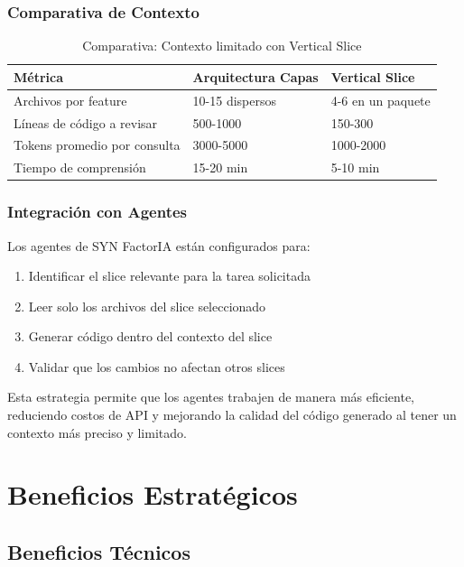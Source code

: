 \documentclass[12pt,a4paper,spanish]{article}
\begin{document}
\subsubsection{Comparativa de Contexto}

\begin{table}[h]
\centering
\begin{tabular}{@{}p{4cm}p{4cm}p{4cm}@{}}
\toprule
\textbf{Métrica} & \textbf{Arquitectura Capas} & \textbf{Vertical Slice} \\
\midrule
Archivos por feature & 10-15 dispersos & 4-6 en un paquete \\
\midrule
Líneas de código a revisar & 500-1000 & 150-300 \\
\midrule
Tokens promedio por consulta & 3000-5000 & 1000-2000 \\
\midrule
Tiempo de comprensión & 15-20 min & 5-10 min \\
\bottomrule
\end{tabular}
\caption{Comparativa: Contexto limitado con Vertical Slice}
\end{table}

\subsubsection{Integración con Agentes}

Los agentes de SYN FactorIA están configurados para:

\begin{enumerate}
    \item Identificar el slice relevante para la tarea solicitada
    \item Leer solo los archivos del slice seleccionado
    \item Generar código dentro del contexto del slice
    \item Validar que los cambios no afectan otros slices
\end{enumerate}

Esta estrategia permite que los agentes trabajen de manera más eficiente, reduciendo costos de API y mejorando la calidad del código generado al tener un contexto más preciso y limitado.

\newpage

\section{Beneficios Estratégicos}

\subsection{Beneficios Técnicos}
\end{document}

